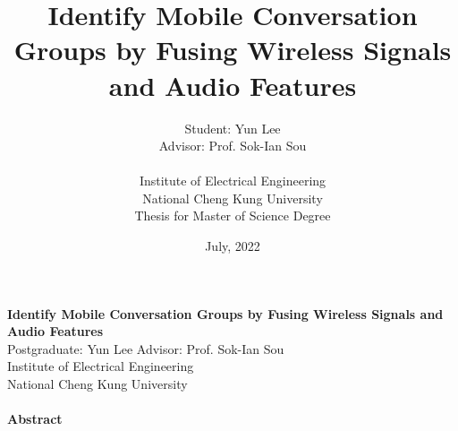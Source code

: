 \documentclass[a4paper,12pt]{report}
\title{Identify Mobile Conversation Groups by Fusing Wireless Signals and Audio Features \\}
\author{Student: Yun Lee \\
Advisor: Prof. Sok-Ian Sou\\
\\
Institute of Electrical Engineering  \\
National Cheng Kung University \\
Thesis for Master of Science Degree \\
}
\date{July, 2022}
\begin{document}

\maketitle

\begin{titlepage}
    \begin{center}
        {\bf\large Identify Mobile Conversation Groups by Fusing Wireless Signals and Audio Features}\\
        {Postgraduate: Yun Lee \hspace{8mm} Advisor: Prof. Sok-Ian Sou}\\
        {Institute of Electrical Engineering}\\
        {National Cheng Kung University}\\
    \end{center}

    \paragraph{}
    \begin{center}
        {\bf Abstract}\\
    \end{center}

\end{titlepage}
\end{document}
